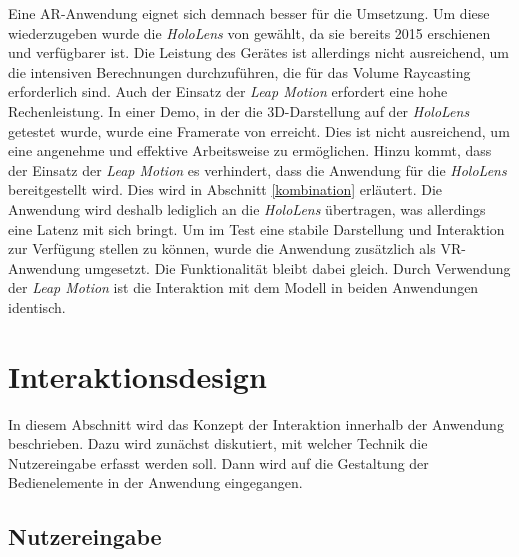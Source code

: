 Eine AR-Anwendung eignet sich demnach besser für die Umsetzung. Um diese wiederzugeben wurde die \textit{HoloLens} von \cite{hololens} gewählt, da sie bereits 2015 erschienen und verfügbarer ist.
Die Leistung des Gerätes ist allerdings nicht ausreichend, um die intensiven Berechnungen durchzuführen, die für das Volume Raycasting erforderlich sind. Auch der Einsatz der \textit{Leap Motion} erfordert eine hohe Rechenleistung.
In einer Demo, in der die 3D-Darstellung auf der \textit{HoloLens} getestet wurde, wurde eine Framerate von 
 erreicht. 
Dies ist nicht ausreichend, um eine angenehme und effektive Arbeitsweise zu ermöglichen. 
Hinzu kommt, dass der Einsatz der \textit{Leap Motion} es verhindert, dass die Anwendung für die \textit{HoloLens} bereitgestellt wird. Dies wird in Abschnitt \ref{kombination} erläutert. Die Anwendung wird deshalb lediglich an die \textit{HoloLens} übertragen, was allerdings eine Latenz mit sich bringt. 
Um im Test eine stabile Darstellung und Interaktion zur Verfügung stellen zu können, wurde die Anwendung zusätzlich als VR-Anwendung umgesetzt. Die Funktionalität bleibt dabei gleich. 
Durch Verwendung der \textit{Leap Motion} ist die Interaktion mit dem Modell in beiden Anwendungen identisch. 

\section{Interaktionsdesign} 

In diesem Abschnitt wird das Konzept der Interaktion innerhalb der Anwendung beschrieben. Dazu wird zunächst diskutiert, mit welcher Technik die Nutzereingabe erfasst werden soll. Dann wird auf die Gestaltung der Bedienelemente in der Anwendung eingegangen.

\subsection{Nutzereingabe}

